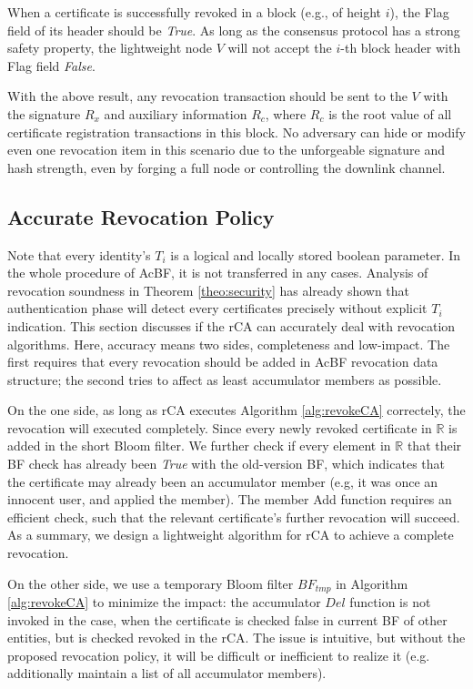 \documentclass[conference]{IEEEtran}
\begin{document}
\begin{IEEEproof}
When a certificate is successfully revoked in a block (e.g., of height $i$), the Flag field of its header should be \textit{True}. As long as the consensus protocol has a strong safety property, the lightweight node $V$ will not accept the $i$-th block header with Flag field \textit{False}. 

With the above result, any revocation transaction should be sent to the $V$ with the signature $R_x$ and auxiliary information $R_c$, where $R_c$ is the root value of all certificate registration transactions in this block. No adversary can hide or modify even one revocation item in this scenario due to the unforgeable signature and hash strength, even by forging a full node or controlling the downlink channel.
\end{IEEEproof}


\subsection{Accurate Revocation Policy}

Note that every identity's $T_i$ is a logical and locally stored boolean parameter. In the whole procedure of AcBF, it is not transferred in any cases. Analysis of revocation soundness in Theorem \ref{theo:security} has already shown that authentication phase will detect every certificates precisely without explicit $T_i$ indication. This section discusses if the rCA can accurately deal with revocation algorithms. Here, accuracy means two sides, completeness and low-impact. The first requires that every revocation should be added in AcBF revocation data structure; the second tries to affect as least accumulator members as possible. 

On the one side, as long as rCA executes Algorithm \ref{alg:revokeCA} correctely, the revocation will executed completely. Since every newly revoked certificate in $\mathbb{R}$ is added in the short Bloom filter. We further check if every element in  $\mathbb{R}$ that their BF check has already been \textit{True} with the old-version BF, which indicates that the certificate may already been an accumulator member (e.g, it was once an innocent user, and applied the member). The member Add function requires an efficient check, such that the relevant certificate's further revocation will succeed. As a summary, we design a lightweight algorithm for rCA to achieve a complete revocation.

On the other side, we use a temporary Bloom filter $BF_{tmp}$ in Algorithm \ref{alg:revokeCA} to minimize the impact: the accumulator $Del$ function is not invoked in the case, when the certificate is checked false in current BF of other entities, but is checked revoked in the rCA. The issue is intuitive, but without the proposed revocation policy, it will be difficult or inefficient to realize it (e.g. additionally maintain a list of all accumulator members).
\end{document}
